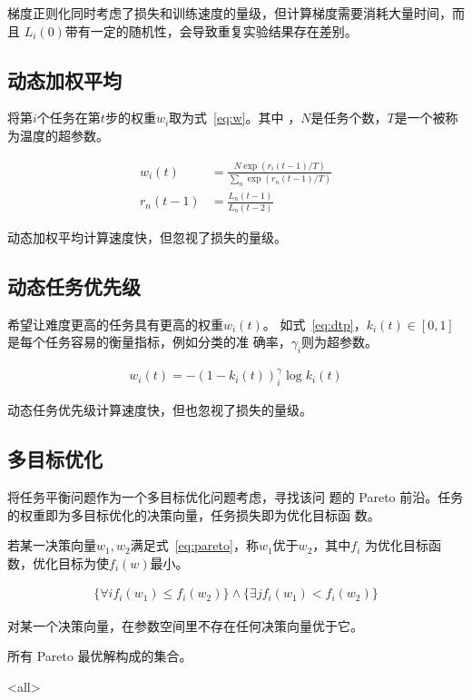 \documentclass[../main]{subfiles}
\begin{document}
梯度正则化同时考虑了损失和训练速度的量级，但计算梯度需要消耗大量时间，而且
$L_i(0)$带有一定的随机性，会导致重复实验结果存在差别。

\subsection{动态加权平均}%
\label{sub:dwa}

\cite{Liu_2019_CVPR}将第$i$个任务在第$t$步的权重$w_i$取为式~\ref{eq:w}。其中
，$N$是任务个数，$T$是一个被称为温度的超参数。

\begin{align}
  \label{eq:w}
  w_i(t) & = \frac{N\exp(r_i(t - 1)/T)}{\sum_n\exp(r_n(t - 1)/T)} \\
  r_n(t - 1) & = \frac{L_n(t - 1)}{L_n(t - 2)}
\end{align}

动态加权平均计算速度快，但忽视了损失的量级。

\subsection{动态任务优先级}%
\label{sub:dtp}

\cite{Guo_2018_ECCV}希望让难度更高的任务具有更高的权重$w_i(t)$。
如式~\ref{eq:dtp}，$k_i(t) \in [0, 1]$是每个任务容易的衡量指标，例如分类的准
确率，$\gamma_i$则为超参数。

\begin{align}
  \label{eq:dtp}
  w_i(t) = -{(1 - k_i(t))}^\gamma_i\log k_i(t)
\end{align}

动态任务优先级计算速度快，但也忽视了损失的量级。

\subsection{多目标优化}%
\label{sub:pareto}

\cite{NEURIPS2019_685bfde0}将任务平衡问题作为一个多目标优化问题考虑，寻找该问
题的 Pareto 前沿。任务的权重即为多目标优化的决策向量，任务损失即为优化目标函
数。

\begin{definition}[Pareto 占优]
  若某一决策向量$w_1, w_2$满足式~\ref{eq:pareto}，称$w_1$优于$w_2$，其中$f_i$
  为优化目标函数，优化目标为使$f_i(w)$最小。
\end{definition}

\begin{align}
  \label{eq:pareto}
  \{\forall i f_i(w_1) \leqslant f_i(w_2)\} \land
  \{\exists j f_i(w_1) < f_i(w_2)\}
\end{align}

\begin{definition}[Pareto 最优]
  对某一个决策向量，在参数空间里不存在任何决策向量优于它。
\end{definition}

\begin{definition}[Pareto 前沿]
  所有 Pareto 最优解构成的集合。
\end{definition}

\mode<all>
\end{document}
